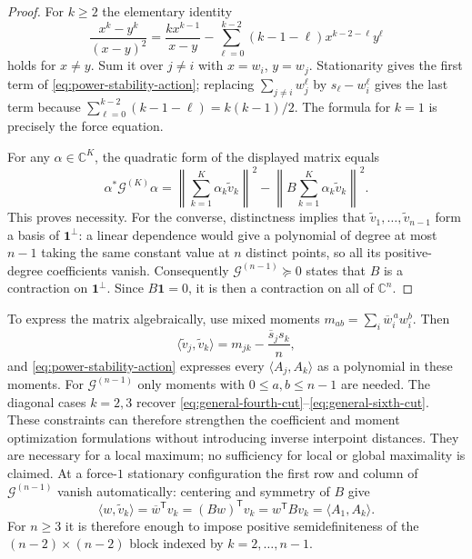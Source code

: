 \documentclass[11pt]{article}
\theoremstyle{remark}
\numberwithin{equation}{section}
\begin{document}
\begin{proof}
For $k\ge2$ the elementary identity
\[
 \frac{x^k-y^k}{(x-y)^2}
 =\frac{kx^{k-1}}{x-y}
  -\sum_{\ell=0}^{k-2}(k-1-\ell)x^{k-2-\ell}y^\ell
\]
holds for $x\ne y$.  Sum it over $j\ne i$ with
$x=w_i$, $y=w_j$.  Stationarity gives the first term of
\eqref{eq:power-stability-action}; replacing
$\sum_{j\ne i}w_j^\ell$ by $s_\ell-w_i^\ell$ gives the last term
because $\sum_{\ell=0}^{k-2}(k-1-\ell)=k(k-1)/2$.
The formula for $k=1$ is precisely the force equation.

For any $\alpha\in\mathbb C^K$, the quadratic form of the displayed
matrix equals
\[
 \alpha^*\mathcal G^{(K)}\alpha
 =\left\|\sum_{k=1}^K\alpha_k\widetilde v_k\right\|^2
  -\left\|B\sum_{k=1}^K\alpha_k\widetilde v_k\right\|^2.
\]
This proves necessity.  For the converse, distinctness implies that
$\widetilde v_1,\ldots,\widetilde v_{n-1}$ form a basis of
$\mathbf1^\perp$: a linear dependence would give a polynomial of
degree at most $n-1$ taking the same constant value at $n$ distinct
points, so all its positive-degree coefficients vanish.
Consequently $\mathcal G^{(n-1)}\succeq0$ states that $B$ is a
contraction on $\mathbf1^\perp$.  Since $B\mathbf1=0$, it is then
a contraction on all of $\mathbb C^n$.
\end{proof}

To express the matrix algebraically, use mixed moments
$m_{ab}=\sum_i\overline w_i^{\,a}w_i^b$.
Then
\[
 \langle\widetilde v_j,\widetilde v_k\rangle
 =m_{jk}-\frac{\overline s_js_k}{n},
\]
and \eqref{eq:power-stability-action} expresses every
$\langle A_j,A_k\rangle$ as a polynomial in these moments.
For $\mathcal G^{(n-1)}$ only moments with
$0\le a,b\le n-1$ are needed.
The diagonal cases $k=2,3$ recover
\eqref{eq:general-fourth-cut}--\eqref{eq:general-sixth-cut}.
These constraints can therefore strengthen the coefficient and
moment optimization formulations without introducing inverse
interpoint distances.  They are necessary for a local maximum;
no sufficiency for local or global maximality is claimed.
At a force-$1$ stationary configuration the first row and column
of $\mathcal G^{(n-1)}$ vanish automatically: centering and symmetry
of $B$ give
\[
 \langle w,\widetilde v_k\rangle
 =\overline w^{\mathsf T}v_k
 =(Bw)^{\mathsf T}v_k
 =w^{\mathsf T}Bv_k
 =\langle A_1,A_k\rangle.
\]
For $n\ge3$ it is therefore enough to impose positive
semidefiniteness of the $(n-2)\times(n-2)$ block indexed by
$k=2,\ldots,n-1$.
\end{document}
